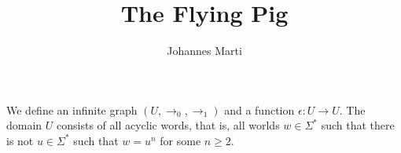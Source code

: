 \documentclass[a4paper]{article}
\title{The Flying Pig}
\author{Johannes Marti}
\begin{document}
\maketitle

We define an infinite graph $(U,\rightarrow_0,\rightarrow_1)$ and a
function $\epsilon : U \to U$. The domain $U$ consists of all acyclic
words, that is, all worlds $w \in \Sigma^*$ such that there is not $u
\in \Sigma^*$ such that $w = u^n$ for some $n \geq 2$.
\end{document}
